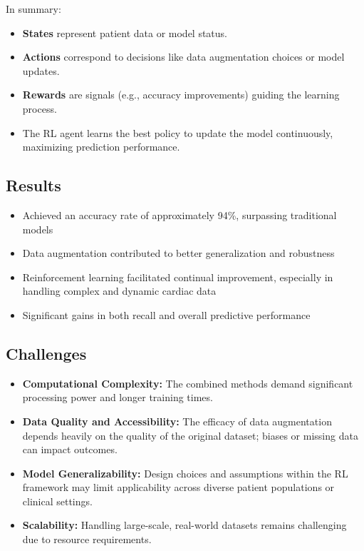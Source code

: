 \noindent In summary:
\begin{itemize}
    \item \textbf{States} represent patient data or model status.
    \item \textbf{Actions} correspond to decisions like data augmentation choices or model updates.
    \item \textbf{Rewards} are signals (e.g., accuracy improvements) guiding the learning process.
    \item The RL agent learns the best policy to update the model continuously, maximizing prediction performance.
\end{itemize}

\subsection*{Results}
\begin{itemize}
    \item Achieved an accuracy rate of approximately 94\%, surpassing traditional models
    \item Data augmentation contributed to better generalization and robustness
    \item Reinforcement learning facilitated continual improvement, especially in handling complex and dynamic cardiac data
    \item Significant gains in both recall and overall predictive performance
\end{itemize}

\subsection*{Challenges}
\begin{itemize}
    \item \textbf{Computational Complexity:} The combined methods demand significant processing power and longer training times.
    \item \textbf{Data Quality and Accessibility:} The efficacy of data augmentation depends heavily on the quality of the original dataset; biases or missing data can impact outcomes.
    \item \textbf{Model Generalizability:} Design choices and assumptions within the RL framework may limit applicability across diverse patient populations or clinical settings.
    \item \textbf{Scalability:} Handling large-scale, real-world datasets remains challenging due to resource requirements.
\end{itemize}

